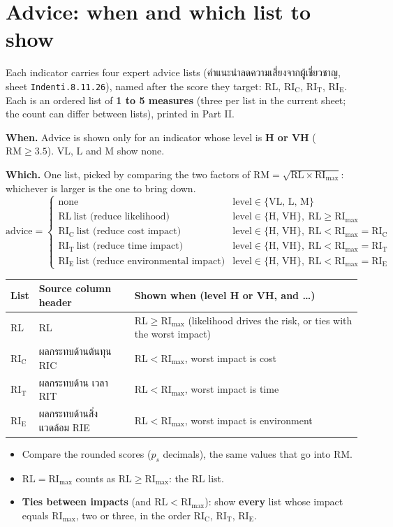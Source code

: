 \documentclass[10pt,a4paper]{article}
\newcommand{\RL}{\mathrm{RL}}\newcommand{\RIC}{\mathrm{RI_C}}\newcommand{\RIT}{\mathrm{RI_T}}\newcommand{\RIE}{\mathrm{RI_E}}
\newcommand{\RImax}{\mathrm{RI}_{\max}}\newcommand{\RM}{\mathrm{RM}}
\begin{document}
\section{Advice: when and which list to show}\label{sec:adv}
Each indicator carries four expert advice lists (คำแนะนำลดความเสี่ยงจากผู้เชี่ยวชาญ, sheet \texttt{Indenti.8.11.26}), named after the score they target: $\RL$, $\RIC$, $\RIT$, $\RIE$. Each is an ordered list of \textbf{1 to 5 measures} (three per list in the current sheet; the count can differ between lists), printed in Part II.

\textbf{When.} Advice is shown only for an indicator whose level is \textbf{H or VH} ($\RM\ge3.5$). VL, L and M show none.

\textbf{Which.} One list, picked by comparing the two factors of $\RM=\sqrt{\RL\times\RImax}$: whichever is larger is the one to bring down.
\[
\text{advice}=\begin{cases}
\text{none} & \text{level}\in\{\text{VL, L, M}\}\\[2pt]
\RL\ \text{list (reduce likelihood)} & \text{level}\in\{\text{H, VH}\},\ \RL\ge\RImax\\[2pt]
\RIC\ \text{list (reduce cost impact)} & \text{level}\in\{\text{H, VH}\},\ \RL<\RImax=\RIC\\[2pt]
\RIT\ \text{list (reduce time impact)} & \text{level}\in\{\text{H, VH}\},\ \RL<\RImax=\RIT\\[2pt]
\RIE\ \text{list (reduce environmental impact)} & \text{level}\in\{\text{H, VH}\},\ \RL<\RImax=\RIE
\end{cases}
\]
\begin{center}\small
\begin{tabularx}{\linewidth}{@{}l l X@{}}
\toprule
List & Source column header & Shown when (level H or VH, and \dots)\\\midrule
$\RL$  & RL & $\RL\ge\RImax$ (likelihood drives the risk, or ties with the worst impact)\\
$\RIC$ & ผลกระทบด้านต้นทุน RIC & $\RL<\RImax$, worst impact is cost\\
$\RIT$ & ผลกระทบด้าน เวลา RIT & $\RL<\RImax$, worst impact is time\\
$\RIE$ & ผลกระทบด้านสิ่งแวดล้อม RIE & $\RL<\RImax$, worst impact is environment\\
\bottomrule
\end{tabularx}
\end{center}
\begin{itemize}[leftmargin=1.4em,labelwidth=1em,align=left]
\item[•] Compare the rounded scores ($p_s$ decimals), the same values that go into $\RM$.
\item[•] $\RL=\RImax$ counts as $\RL\ge\RImax$: the $\RL$ list.
\item[•] \textbf{Ties between impacts} (and $\RL<\RImax$): show \textbf{every} list whose impact equals $\RImax$, two or three, in the order $\RIC$, $\RIT$, $\RIE$.
\end{itemize}
\end{document}
